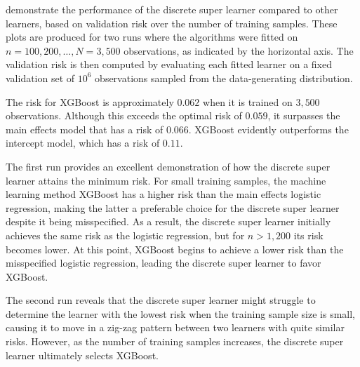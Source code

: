 \documentclass[./main.tex]{subfiles}
\begin{document}
\pagebreak
{} demonstrate the performance of the discrete super learner compared to other learners, based on validation risk over the number of training samples. These plots are produced for two runs where the algorithms were fitted on $ n = 100, 200, \dots , N = 3,500 $ observations, as indicated by the horizontal axis. The validation risk is then computed by evaluating each fitted learner on a fixed validation set of $ 10^{6} $ observations sampled from the data-generating distribution.  

The risk for XGBoost is approximately $ 0.062 $ when it is trained on $ 3,500 $ observations. Although this exceeds the optimal risk of $ 0.059 $, it surpasses the main effects model that has a risk of $ 0.066 $. XGBoost evidently outperforms the intercept model, which has a risk of $ 0.11 $. 

The first run provides an excellent demonstration of how the discrete super learner attains the minimum risk. For small training samples, the machine learning method XGBoost has a higher risk than the main effects logistic regression, making the latter a preferable choice for the discrete super learner despite it being misspecified. As a result, the discrete super learner initially achieves the same risk as the logistic regression, but for $ n > 1,200 $ its risk becomes lower. At this point, XGBoost begins to achieve a lower risk than the misspecified logistic regression, leading the discrete super learner to favor XGBoost. 

The second run reveals that the discrete super learner might struggle to determine the learner with the lowest risk when the training sample size is small, causing it to move in a zig-zag pattern between two learners with quite similar risks. However, as the number of training samples increases, the discrete super learner ultimately selects XGBoost.
\end{document}
